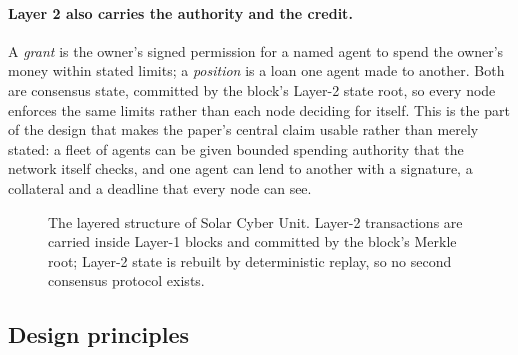 \documentclass{article}
\begin{document}
\paragraph{Layer 2 also carries the authority and the credit.} A \emph{grant}
is the owner's signed permission for a named agent to spend the owner's money
within stated limits; a \emph{position} is a loan one agent made to another.
Both are consensus state, committed by the block's Layer-2 state root, so every
node enforces the same limits rather than each node deciding for itself. This
is the part of the design that makes the paper's central claim usable rather
than merely stated: a fleet of agents can be given bounded spending authority
that the network itself checks, and one agent can lend to another with a
signature, a collateral and a deadline that every node can see.

\begin{figure}[htbp]
\centering
{}
\caption{The layered structure of Solar Cyber Unit. Layer-2 transactions are carried
inside Layer-1 blocks and committed by the block's Merkle root; Layer-2 state is
rebuilt by deterministic replay, so no second consensus protocol exists.}
\label{fig:layers}
\end{figure}

\subsection{Design principles}
\end{document}
